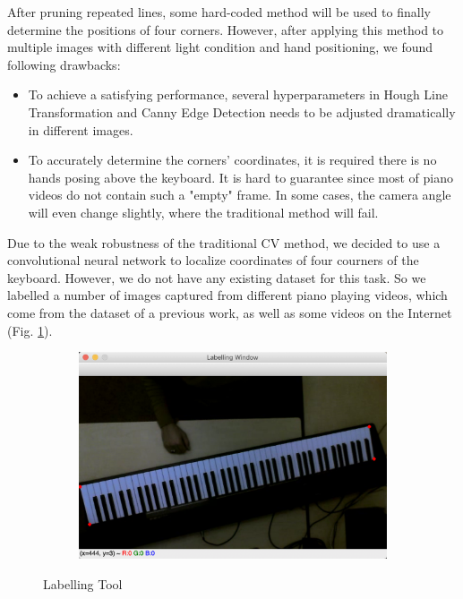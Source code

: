 \documentclass[10pt,twocolumn,letterpaper]{article}
\begin{document}
After pruning repeated lines, some hard-coded method will be used to finally determine the positions of four corners. However, after applying this method to multiple images with different light condition and hand positioning, we found following drawbacks:

\begin{itemize}
  \item To achieve a satisfying performance, several hyperparameters in Hough Line Transformation and Canny Edge Detection needs to be adjusted dramatically in different images.
  \item To accurately determine the corners' coordinates, it is required there is no hands posing above the keyboard. It is hard to guarantee since most of piano videos do not contain such a "empty" frame. In some cases, the camera angle will even change slightly, where the traditional method will fail.
\end{itemize}

Due to the weak robustness of the traditional CV method, we decided to use a convolutional neural network to localize coordinates of four courners of the keyboard. However, we do not have any existing dataset for this task. So we labelled a number of images captured from different piano playing videos, which come from the dataset of a previous work, as well as some videos on the Internet (Fig. \ref{fig:2}).

\begin{figure}[h!]
  \hspace{2.1cm}
  \begin{subfigure}{0.24\textwidth}
    \includegraphics[width=\linewidth]{fig/7.png}
  \end{subfigure}
  \caption{Labelling Tool}
  \label{fig:2}
\end{figure}
\end{document}

